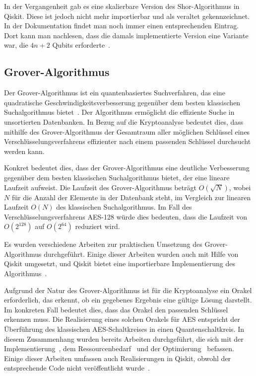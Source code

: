 \documentclass[
  a4paper, %
  10pt, %
  unnumberedsections, %
  twoside, %
]{LTJournalArticle}
\begin{document}
In der Vergangenheit gab es eine skalierbare Version des Shor-Algorithmus in Qiskit.
Diese ist jedoch nicht mehr importierbar und als veraltet gekennzeichnet.
In der Dokumentation findet man noch immer einen entsprechenden Eintrag.
Dort kann man nachlesen, dass die damals implementierte Version eine Variante war,
die \(4n+2\) Qubits erforderte~\autocite{IBM:Shor_docu}.

\subsection{Grover-Algorithmus}
Der Grover-Algorithmus ist ein quantenbasiertes Suchverfahren,
das eine quadratische Geschwindigkeitsverbesserung
gegenüber dem besten klassischen Suchalgorithmus bietet~\autocite{grover1996fast}.
Der Algorithmus ermöglicht die effiziente Suche in unsortierten Datenbanken.
In Bezug auf die Kryptoanalyse bedeutet dies,
dass mithilfe des Grover-Algorithmus der Gesamtraum aller möglichen Schlüssel
eines Verschlüsselungsverfahrens effizienter nach einem passenden Schlüssel durchsucht werden kann.

Konkret bedeutet dies,
dass der Grover-Algorithmus eine deutliche Verbesserung gegenüber dem besten klassischen Suchalgorithmus bietet,
der eine lineare Laufzeit aufweist.
Die Laufzeit des Grover-Algorithmus beträgt \(O(\sqrt N)\),
wobei \(N\) für die Anzahl der Elemente in der Datenbank steht,
im Vergleich zur linearen Laufzeit \(O(N)\) des klassischen Suchalgorithmus.
Im Fall des Verschlüsselungsverfahrens AES-128 würde dies bedeuten,
dass die Laufzeit von \(O(2^{128})\) auf \(O(2^{64})\) reduziert wird.

Es wurden verschiedene Arbeiten zur praktischen Umsetzung des Grover-Algorithmus durchgeführt.
Einige dieser Arbeiten wurden auch mit Hilfe von Qiskit umgesetzt,
und Qiskit bietet eine importierbare Implementierung des Algorithmus~\autocite{IBM:Grover}.

Aufgrund der Natur des Grover-Algorithmus ist für die Kryptoanalyse ein Orakel erforderlich,
das erkennt, ob ein gegebenes Ergebnis eine gültige Lösung darstellt.
Im konkreten Fall bedeutet dies, dass das Orakel den passenden Schlüssel erkennen muss.
Die Realisierung eines solchen Orakels für AES
entspricht der Überführung des klassischen AES-Schaltkreises in einen Quantenschaltkreis.
In diesem Zusammenhang wurden bereits Arbeiten durchgeführt,
die sich mit der Implementierung~\autocite{jaques2019implementing},
dem Ressourcenbedarf~\autocite{grassl2015applying} und der Optimierung~\autocite{Li2022} befassen.
Einige dieser Arbeiten umfassen auch Realisierungen in Qiskit,
obwohl der entsprechende Code nicht veröffentlicht wurde~\autocite{app11199085}.
\end{document}
